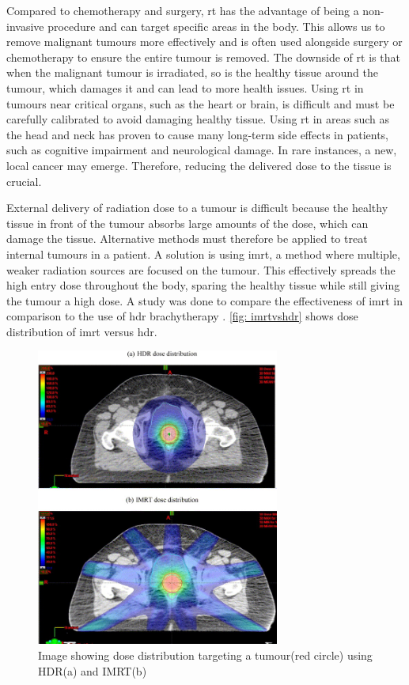 \documentclass[main.tex]{subfiles}
\begin{document}
 Compared to chemotherapy and surgery, \gls{rt} has the advantage of being a non-invasive procedure and can target specific areas in the body. This allows us to remove malignant tumours more effectively and is often used alongside surgery or chemotherapy to ensure the entire tumour is removed. The downside of \gls{rt} is that when the malignant tumour is irradiated, so is the healthy tissue around the tumour, which damages it and can lead to more health issues. Using \gls{rt} in tumours near critical organs, such as the heart or brain, is difficult and must be carefully calibrated to avoid damaging healthy tissue. Using \gls{rt} in areas such as the head and neck has proven to cause many long-term side effects in patients, such as cognitive impairment and neurological damage. In rare instances, a new, local cancer may emerge\cite{headRTData}. Therefore, reducing the delivered dose to the tissue is crucial.
 
 External delivery of radiation dose to a tumour is difficult because the healthy tissue in front of the tumour absorbs large amounts of the dose, which can damage the tissue. Alternative methods must therefore be applied to treat internal tumours in a patient. A solution is using \gls{imrt}, a method where multiple, weaker radiation sources are focused on the tumour. This effectively spreads the high entry dose throughout the body, sparing the healthy tissue while still giving the tumour a high dose. A study was done to compare the effectiveness of \gls{imrt} in comparison to the use of \gls{hdr} brachytherapy \cite{imrtVShdr}. \autoref{fig: imrtvshdr} shows dose distribution of \gls{imrt} versus \gls{hdr}.

 \begin{figure}[!htpb]
    \centering
    \includegraphics[width=8cm ]{images/imrt vs hdr.jpg}
    \caption{Image showing dose distribution targeting a tumour(red circle) using HDR(a) and IMRT(b)\cite{imrtVShdr}}
    \label{fig: imrtvshdr}
\end{figure}
\FloatBarrier 
\end{document}

